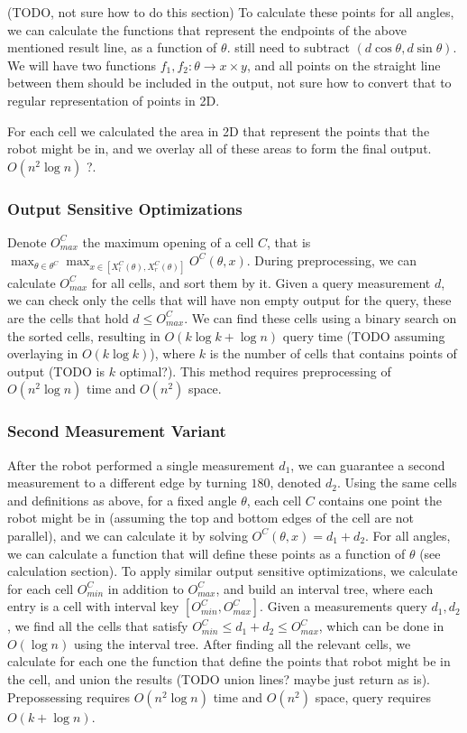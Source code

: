 \documentclass[a4paper,12pt]{extarticle}
\begin{document}
(TODO, not sure how to do this section) To calculate these points for all angles, we can calculate the functions that represent the endpoints of the above mentioned result line, as a function of $\theta$. still need to subtract $(d\cos \theta,d\sin \theta)$. We will have two functions $f_{1},f_{2}:\theta \rightarrow x\times y$, and all points on the straight line between them should be included in the output, not sure how to convert that to regular representation of points in 2D.

For each cell we calculated the area in 2D that represent the points that the robot might be in, and we overlay all of these areas to form the final output. $O(n^{2} \log n)$ ?.

\subsubsection*{Output Sensitive Optimizations}

Denote $O^{C}_{max}$ the maximum opening of a cell $C$, that is $\max_{\theta \in \theta ^{C}} \max_{x \in [X^{C}_{l}(\theta),X^{C}_{r}(\theta)]} O^{C}(\theta,x)$. During preprocessing, we can calculate $O^{C}_{max}$ for all cells, and sort them by it. Given a query measurement $d$, we can check only the cells that will have non empty output for the query, these are the cells that hold $d \leq O^{C}_{max}$. We can find these cells using a binary search on the sorted cells, resulting in $O(k\log k + \log n)$ query time (TODO assuming overlaying in $O(k\log k)$), where $k$ is the number of cells that contains points of output (TODO is $k$ optimal?). This method requires preprocessing of $O(n^{2}\log n)$ time and $O(n^{2})$ space.

\subsubsection*{Second Measurement Variant}

After the robot performed a single measurement $d_{1}$, we can guarantee a second measurement to a different edge by turning $180$\textdegree, denoted $d_{2}$. Using the same cells and definitions as above, for a fixed angle $\theta$, each cell $C$ contains one point the robot might be in (assuming the top and bottom edges of the cell are not parallel), and we can calculate it by solving $O^{C}(\theta,x)=d_{1}+d_{2}$. For all angles, we can calculate a function that will define these points as a function of $\theta$ (see calculation section). To apply similar output sensitive optimizations, we calculate for each cell $O^{C}_{min}$ in addition to $O^{C}_{max}$, and build an interval tree, where each entry is a cell with interval key $[O^{C}_{min},O^{C}_{max}]$. Given a measurements query $d_{1},d_{2}$, we find all the cells that satisfy $O^{C}_{min} \leq d_{1}+d_{2} \leq O^{C}_{max}$, which can be done in $O(\log n)$ using the interval tree. After finding all the relevant cells, we calculate for each one the function that define the points that robot might be in the cell, and union the results (TODO union lines? maybe just return as is). Prepossessing requires $O(n^{2} \log n)$ time and $O(n^{2})$ space, query requires $O(k + \log n)$.
\end{document}

